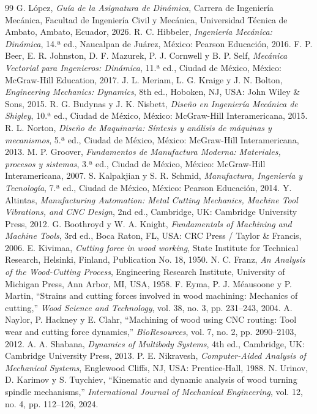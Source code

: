 \documentclass[12pt,a4paper]{article}
\begin{document}
\begin{thebibliography}{99}
\setlength{\itemsep}{1.2pt}
\setlength{\parskip}{0pt}
 G. López, \textit{Guía de la Asignatura de Dinámica}, Carrera de Ingeniería Mecánica, Facultad de Ingeniería Civil y Mecánica, Universidad Técnica de Ambato, Ambato, Ecuador, 2026.
 R. C. Hibbeler, \textit{Ingeniería Mecánica: Dinámica}, 14.ª ed., Naucalpan de Juárez, México: Pearson Educación, 2016.
 F. P. Beer, E. R. Johnston, D. F. Mazurek, P. J. Cornwell y B. P. Self, \textit{Mecánica Vectorial para Ingenieros: Dinámica}, 11.ª ed., Ciudad de México, México: McGraw-Hill Education, 2017.
 J. L. Meriam, L. G. Kraige y J. N. Bolton, \textit{Engineering Mechanics: Dynamics}, 8th ed., Hoboken, NJ, USA: John Wiley \& Sons, 2015.
 R. G. Budynas y J. K. Nisbett, \textit{Diseño en Ingeniería Mecánica de Shigley}, 10.ª ed., Ciudad de México, México: McGraw-Hill Interamericana, 2015.
 R. L. Norton, \textit{Diseño de Maquinaria: Síntesis y análisis de máquinas y mecanismos}, 5.ª ed., Ciudad de México, México: McGraw-Hill Interamericana, 2013.
 M. P. Groover, \textit{Fundamentos de Manufactura Moderna: Materiales, procesos y sistemas}, 3.ª ed., Ciudad de México, México: McGraw-Hill Interamericana, 2007.
 S. Kalpakjian y S. R. Schmid, \textit{Manufactura, Ingeniería y Tecnología}, 7.ª ed., Ciudad de México, México: Pearson Educación, 2014.
 Y. Altintas, \textit{Manufacturing Automation: Metal Cutting Mechanics, Machine Tool Vibrations, and CNC Design}, 2nd ed., Cambridge, UK: Cambridge University Press, 2012.
 G. Boothroyd y W. A. Knight, \textit{Fundamentals of Machining and Machine Tools}, 3rd ed., Boca Raton, FL, USA: CRC Press / Taylor \& Francis, 2006.
 E. Kivimaa, \textit{Cutting force in wood working}, State Institute for Technical Research, Helsinki, Finland, Publication No. 18, 1950.
 N. C. Franz, \textit{An Analysis of the Wood-Cutting Process}, Engineering Research Institute, University of Michigan Press, Ann Arbor, MI, USA, 1958.
 F. Eyma, P. J. Méausoone y P. Martin, ``Strains and cutting forces involved in wood machining: Mechanics of cutting,'' \textit{Wood Science and Technology}, vol. 38, no. 3, pp. 231--243, 2004.
 A. Naylor, P. Hackney y E. Clahr, ``Machining of wood using CNC routing: Tool wear and cutting force dynamics,'' \textit{BioResources}, vol. 7, no. 2, pp. 2090--2103, 2012.
 A. A. Shabana, \textit{Dynamics of Multibody Systems}, 4th ed., Cambridge, UK: Cambridge University Press, 2013.
 P. E. Nikravesh, \textit{Computer-Aided Analysis of Mechanical Systems}, Englewood Cliffs, NJ, USA: Prentice-Hall, 1988.
 N. Urinov, D. Karimov y S. Tuychiev, ``Kinematic and dynamic analysis of wood turning spindle mechanisms,'' \textit{International Journal of Mechanical Engineering}, vol. 12, no. 4, pp. 112--126, 2024.
\end{thebibliography}
\end{document}
